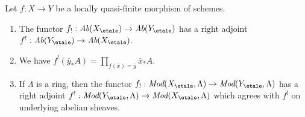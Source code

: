 \begin{lemma}
\label{lemma-lqf-f-upper-shriek}
Let $f : X \to Y$ be a locally quasi-finite morphism of schemes.
\begin{enumerate}
\item The functor $f_! : \textit{Ab}(X_\etale) \to \textit{Ab}(Y_\etale)$
has a right adjoint $f^! : \textit{Ab}(Y_\etale) \to \textit{Ab}(X_\etale)$.
\item We have
$f^!(\overline{y}_*A) = \prod_{f(\overline{x}) = \overline{y}} \overline{x}_*A$.
\item If $\Lambda$ is a ring, then the functor
$f_! : \textit{Mod}(X_\etale, \Lambda) \to \textit{Mod}(Y_\etale, \Lambda)$
has a right adjoint
$f^! : \textit{Mod}(Y_\etale, \Lambda) \to \textit{Mod}(X_\etale, \Lambda)$
which agrees with $f^!$ on underlying abelian sheaves.
\end{enumerate}
\end{lemma}

